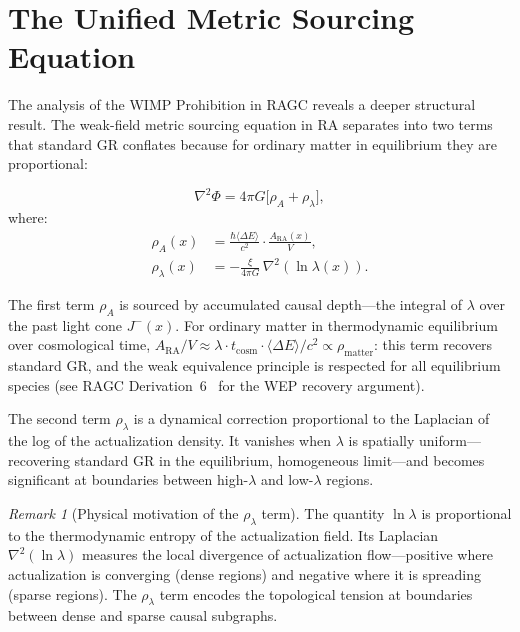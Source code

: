\documentclass[11pt,a4paper]{article}
\theoremstyle{plain}
\theoremstyle{definition}
\theoremstyle{remark}
\newtheorem{remark}[theorem]{Remark}
\newcommand{\ARA}{A_{\mathrm{RA}}}
\begin{document}
\section{The Unified Metric Sourcing Equation}
\label{sec:sourcing}

The analysis of the WIMP Prohibition in RAGC reveals a deeper structural result.
The weak-field metric sourcing equation in RA separates into two terms that
standard GR conflates because for ordinary matter in equilibrium they are
proportional:

\begin{equation}
  \nabla^2\Phi = 4\pi G\bigl[\rho_A + \rho_\lambda\bigr],
  \label{eq:unified}
\end{equation}
where:
\begin{align}
  \rho_A(x) &= \frac{\hbar\langle\Delta E\rangle}{c^2}
    \cdot \frac{\ARA(x)}{V}, \label{eq:rhoA} \\
  \rho_\lambda(x) &= -\frac{\xi}{4\pi G}\,\nabla^2(\ln\lambda(x)).
    \label{eq:rhoL}
\end{align}

The first term $\rho_A$ is sourced by accumulated causal depth---the integral of
$\lambda$ over the past light cone $J^-(x)$. For ordinary matter in thermodynamic
equilibrium over cosmological time, $\ARA/V \approx \lambda \cdot t_{\mathrm{cosm}}
\cdot \langle\Delta E\rangle/c^2 \propto \rho_{\mathrm{matter}}$: this term
recovers standard GR, and the weak equivalence principle is respected for all
equilibrium species (see RAGC Derivation~6~\citep{Sandeman2026b} for the
WEP recovery argument).

The second term $\rho_\lambda$ is a dynamical correction proportional to the
Laplacian of the log of the actualization density. It vanishes when $\lambda$ is
spatially uniform---recovering standard GR in the equilibrium, homogeneous
limit---and becomes significant at boundaries between high-$\lambda$ and
low-$\lambda$ regions.

\begin{remark}[Physical motivation of the $\rho_\lambda$ term]
The quantity $\ln\lambda$ is proportional to the thermodynamic entropy of the
actualization field. Its Laplacian $\nabla^2(\ln\lambda)$ measures the local
divergence of actualization flow---positive where actualization is converging
(dense regions) and negative where it is spreading (sparse regions). The
$\rho_\lambda$ term encodes the topological tension at boundaries between
dense and sparse causal subgraphs.
\end{remark}
\end{document}
